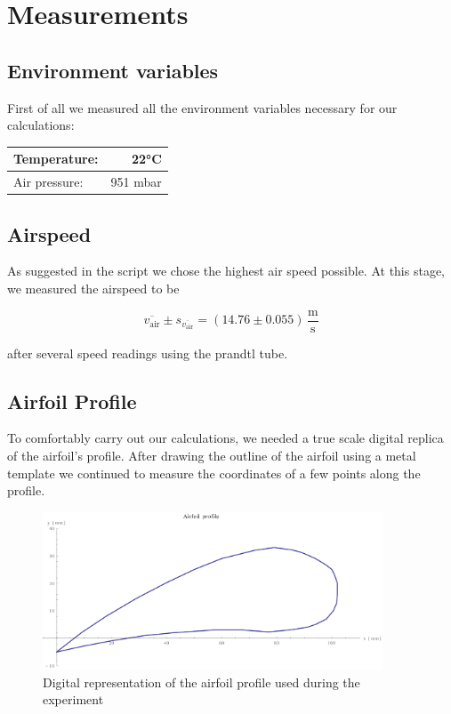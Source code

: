 \documentclass{scrreprt}
\newcommand{\unit}[1]{\ensuremath{\, \mathrm{#1}}}
\begin{document}
\section{Measurements}
\subsection{Environment variables}
First of all we measured all the environment variables necessary for our calculations:

\begin{table}[H]
\centering
\begin{tabular}{|l|r|}
\hline
Temperature: & \ang{22}C\\
\hline
Air pressure: & 951 mbar\\
\hline
\end{tabular}
\end{table}

\subsection{Airspeed}
As suggested in the script we chose the highest air speed possible. At this stage, we measured the airspeed to be 

\[\overline{v_{\text{air}}}\pm s_{\overline{v_{\text{air}}}} = (14.76 \pm 0.055)\unit{\frac{m}{s}}\]

after several speed readings using the prandtl tube.

\subsection{Airfoil Profile}
To comfortably carry out our calculations, we needed a true scale digital replica of the airfoil's profile. After drawing the outline of the airfoil using a metal template we continued to measure the coordinates of a few points along the profile.

\begin{figure}[H]
	\centering
  \includegraphics[width=0.9\textwidth]{diag/wing_profile.pdf}
	\caption{Digital representation of the airfoil profile used during the experiment}
	\label{fig:profile}
\end{figure}
\end{document}
